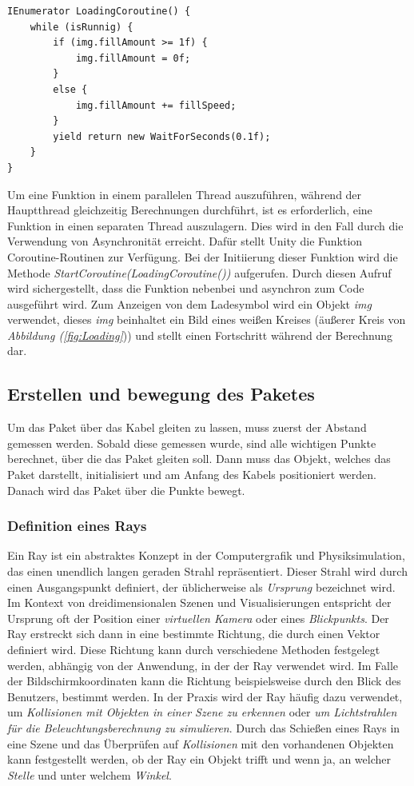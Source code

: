 \begin{lstlisting}[style=csharp, caption={Code zum ausführen des lade Symbols}, label=code:LoadingCoroutine]
IEnumerator LoadingCoroutine() {
    while (isRunnig) {
        if (img.fillAmount >= 1f) {
            img.fillAmount = 0f;
        }
        else {
            img.fillAmount += fillSpeed;
        }
        yield return new WaitForSeconds(0.1f);
    }
}
\end{lstlisting}
Um eine Funktion in einem parallelen Thread auszuführen, während der Hauptthread gleichzeitig Berechnungen durchführt, ist es erforderlich, eine Funktion in einen separaten Thread auszulagern. Dies wird in den Fall durch die Verwendung von Asynchronität erreicht. Dafür stellt Unity die Funktion Coroutine-Routinen zur Verfügung. Bei der Initiierung dieser Funktion wird die Methode \textit{StartCoroutine(LoadingCoroutine())} aufgerufen. Durch diesen Aufruf wird sichergestellt, dass die Funktion nebenbei und asynchron zum Code ausgeführt wird. Zum Anzeigen von dem Ladesymbol wird ein Objekt \textit{img} verwendet, dieses \textit{img} beinhaltet ein Bild eines weißen Kreises (äußerer Kreis von \textit{Abbildung (\ref{fig:Loading}})) und stellt einen Fortschritt während der Berechnung dar.


\subsection{Erstellen und bewegung des Paketes}
Um das Paket über das Kabel gleiten zu lassen, muss zuerst der Abstand gemessen werden. Sobald diese gemessen wurde, sind alle wichtigen Punkte berechnet, über die das Paket gleiten soll. Dann muss das Objekt, welches das Paket darstellt, initialisiert und am Anfang des Kabels positioniert werden. Danach wird das Paket über die Punkte bewegt.
\subsubsection{Definition eines Rays}
Ein Ray ist ein abstraktes Konzept in der Computergrafik und Physiksimulation, das einen unendlich langen geraden Strahl repräsentiert. Dieser Strahl wird durch einen Ausgangspunkt definiert, der üblicherweise als \textit{Ursprung} bezeichnet wird. Im Kontext von dreidimensionalen Szenen und Visualisierungen entspricht der Ursprung oft der Position einer \textit{virtuellen Kamera} oder eines \textit{Blickpunkts}. Der Ray erstreckt sich dann in eine bestimmte Richtung, die durch einen Vektor definiert wird. Diese Richtung kann durch verschiedene Methoden festgelegt werden, abhängig von der Anwendung, in der der Ray verwendet wird. Im Falle der Bildschirmkoordinaten kann die Richtung beispielsweise durch  den Blick des Benutzers, bestimmt werden. In der Praxis wird der Ray häufig dazu verwendet, um \textit{Kollisionen mit Objekten in einer Szene zu erkennen} oder \textit{um Lichtstrahlen für die Beleuchtungsberechnung zu simulieren}. Durch das Schießen eines Rays in eine Szene und das Überprüfen auf \textit{Kollisionen} mit den vorhandenen Objekten kann festgestellt werden, ob der Ray ein Objekt trifft und wenn ja, an welcher \textit{Stelle} und unter welchem \textit{Winkel}.\\
